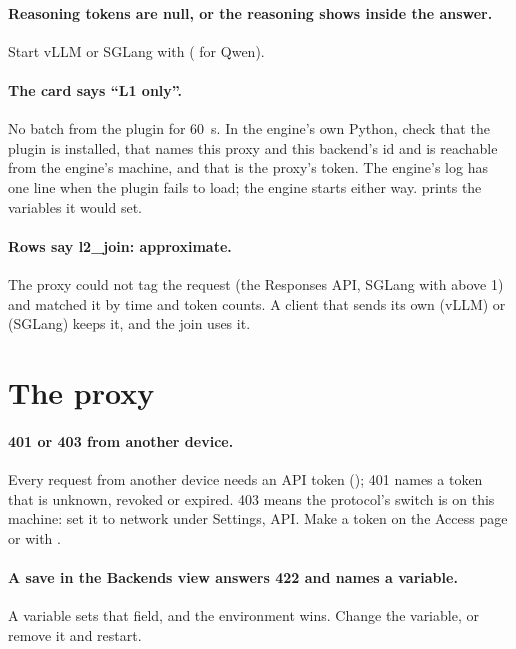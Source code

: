 \paragraph{Reasoning tokens are null, or the reasoning shows inside the answer.} Start vLLM or SGLang with  ( for Qwen).

\paragraph{The card says \enquote{L1 only}.} No batch from the plugin for 60~s. In the engine's own Python, check that the plugin is installed, that  names this proxy and this backend's id and is reachable from the engine's machine, and that  is the proxy's token. The engine's log has one line when the plugin fails to load; the engine starts either way.  prints the variables it would set.

\paragraph{Rows say l2\_join: approximate.} The proxy could not tag the request (the Responses API, SGLang with  above 1) and matched it by time and token counts. A client that sends its own  (vLLM) or  (SGLang) keeps it, and the join uses it.

\section{The proxy}

\paragraph{401 or 403 from another device.} Every request from another device needs an API token (); 401 names a token that is unknown, revoked or expired. 403  means the protocol's switch is on this machine: set it to network under Settings, API. Make a token on the Access page or with .

\paragraph{A save in the Backends view answers 422 and names a variable.} A  variable sets that field, and the environment wins. Change the variable, or remove it and restart.

